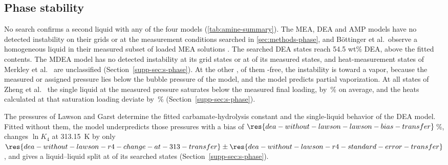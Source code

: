 \FloatBarrier
\subsection{Phase stability}\label{sec:results-phase}
No search confirms a second liquid with any of the four models (\cref{tab:amine-summary}).
The MEA, DEA and AMP models have no detected instability on their grids or at the measurement conditions searched in \cref{sec:methods-phase}, and B\"ottinger et al.\ observe a homogeneous liquid in their measured subset of loaded MEA solutions \cite{Bottinger2008}.
The searched DEA states reach 54.5 wt\% DEA, above the fitted contents.
The MDEA model has no detected instability at its grid states or at  of its  measured states, and  heat-measurement states of Merkley et al.\ \cite{merkleyEnthalpiesAbsorptionCarbon1987} are unclassified (Section~\ref{supp-sec:s-phase}).
At the other ,  of them \COtwo-free, the instability is toward a vapor, because the measured or assigned pressure lies below the bubble pressure of the model, and the model predicts partial vaporization.
At all  states of Zheng et al.\ \cite{zhengCO2HeatAbsorption2020} the single liquid at the measured pressure saturates below the measured final loading, by \,\% on average, and the heats calculated at that saturation loading deviate by \,\% (Section~\ref{supp-sec:s-phase}).

The pressures of Lawson and Garst determine the fitted carbamate-hydrolysis constant and the single-liquid behavior of the DEA model.
Fitted without them, the model underpredicts those pressures with a bias of $\res{dea-without-lawson-lawson-bias-transfer}$\,\%, changes $\ln K_4$ at \SI{313.15}{\kelvin} by only $\res{dea-without-lawson-r4-change-at-313-transfer}\pm\res{dea-without-lawson-r4-standard-error-transfer}$, and gives a liquid--liquid split at  of its  searched states (Section~\ref{supp-sec:s-phase}).

